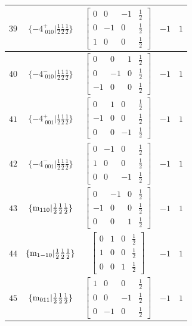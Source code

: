 \documentclass[fleqn,8pt]{jsarticle}
\begin{document}
\begin{longtable}{ccccc}
$ 39 $ & $ \{-4^{+}_{\,\,010}|\frac{1}{2} \frac{1}{2} \frac{1}{2}\} $ & $ \begin{bmatrix} 0 & 0 & -1 & \frac{1}{2} \\ 0 & -1 & 0 & \frac{1}{2} \\ 1 & 0 & 0 & \frac{1}{2} \end{bmatrix} $ & $ -1 $ & $ 1 $ \\ \hline
$ 40 $ & $ \{-4^{-}_{\,\,010}|\frac{1}{2} \frac{1}{2} \frac{1}{2}\} $ & $ \begin{bmatrix} 0 & 0 & 1 & \frac{1}{2} \\ 0 & -1 & 0 & \frac{1}{2} \\ -1 & 0 & 0 & \frac{1}{2} \end{bmatrix} $ & $ -1 $ & $ 1 $ \\ \hline
$ 41 $ & $ \{-4^{+}_{\,\,001}|\frac{1}{2} \frac{1}{2} \frac{1}{2}\} $ & $ \begin{bmatrix} 0 & 1 & 0 & \frac{1}{2} \\ -1 & 0 & 0 & \frac{1}{2} \\ 0 & 0 & -1 & \frac{1}{2} \end{bmatrix} $ & $ -1 $ & $ 1 $ \\ \hline
$ 42 $ & $ \{-4^{-}_{\,\,001}|\frac{1}{2} \frac{1}{2} \frac{1}{2}\} $ & $ \begin{bmatrix} 0 & -1 & 0 & \frac{1}{2} \\ 1 & 0 & 0 & \frac{1}{2} \\ 0 & 0 & -1 & \frac{1}{2} \end{bmatrix} $ & $ -1 $ & $ 1 $ \\ \hline
$ 43 $ & $ \{{\rm m}_{110}|\frac{1}{2} \frac{1}{2} \frac{1}{2}\} $ & $ \begin{bmatrix} 0 & -1 & 0 & \frac{1}{2} \\ -1 & 0 & 0 & \frac{1}{2} \\ 0 & 0 & 1 & \frac{1}{2} \end{bmatrix} $ & $ -1 $ & $ 1 $ \\ \hline
$ 44 $ & $ \{{\rm m}_{1-10}|\frac{1}{2} \frac{1}{2} \frac{1}{2}\} $ & $ \begin{bmatrix} 0 & 1 & 0 & \frac{1}{2} \\ 1 & 0 & 0 & \frac{1}{2} \\ 0 & 0 & 1 & \frac{1}{2} \end{bmatrix} $ & $ -1 $ & $ 1 $ \\ \hline
$ 45 $ & $ \{{\rm m}_{011}|\frac{1}{2} \frac{1}{2} \frac{1}{2}\} $ & $ \begin{bmatrix} 1 & 0 & 0 & \frac{1}{2} \\ 0 & 0 & -1 & \frac{1}{2} \\ 0 & -1 & 0 & \frac{1}{2} \end{bmatrix} $ & $ -1 $ & $ 1 $ \\ \hline

\end{longtable}
\end{document}
